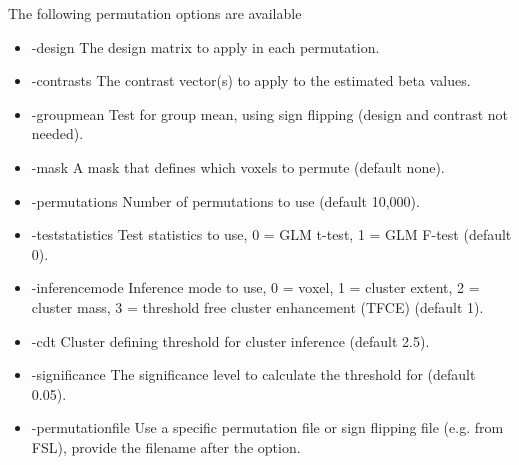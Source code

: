 The following permutation options are available

\begin{itemize}

\item -design
\newline \newline The design matrix to apply in each permutation. 

\item -contrasts                 
\newline \newline The contrast vector(s) to apply to the estimated beta values. 

\item -groupmean                 
\newline \newline Test for group mean, using sign flipping \newline (design and contrast not needed). 

\item -mask                      
\newline \newline A mask that defines which voxels to permute (default none). 

\item -permutations              
\newline \newline Number of permutations to use (default 10,000). 

\item -teststatistics            
\newline \newline Test statistics to use, 0 = GLM t-test, 1 = GLM F-test (default 0).

\item -inferencemode             
\newline \newline Inference mode to use, 0 = voxel, 1 = cluster extent, 2 = cluster mass, 3 = threshold free cluster enhancement (TFCE) (default 1). 

\item -cdt                       
\newline \newline Cluster defining threshold for cluster inference (default 2.5). 

\item -significance              
\newline \newline The significance level to calculate the threshold for (default 0.05). 

\item -permutationfile 
\newline \newline Use a specific permutation file or sign flipping file (e.g. from FSL), \newline provide the filename after the option.

\end{itemize}

